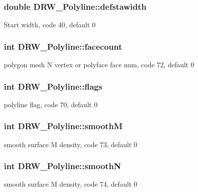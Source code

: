 \subsubsection[{defstawidth}]{\setlength{\rightskip}{0pt plus 5cm}double D\+R\+W\+\_\+\+Polyline\+::defstawidth}\label{class_d_r_w___polyline_a47b35f26221533fdd0d7ef2d91925ca3}
Start width, code 40, default 0 \hypertarget{class_d_r_w___polyline_ae7e68c83478c4dad5550cfc44fa524bd}{}
\subsubsection[{facecount}]{\setlength{\rightskip}{0pt plus 5cm}int D\+R\+W\+\_\+\+Polyline\+::facecount}\label{class_d_r_w___polyline_ae7e68c83478c4dad5550cfc44fa524bd}
polygon mesh N vertex or polyface face num, code 72, default 0 \hypertarget{class_d_r_w___polyline_a328f232ca859ae9f5561e78457833099}{}
\subsubsection[{flags}]{\setlength{\rightskip}{0pt plus 5cm}int D\+R\+W\+\_\+\+Polyline\+::flags}\label{class_d_r_w___polyline_a328f232ca859ae9f5561e78457833099}
polyline flag, code 70, default 0 \hypertarget{class_d_r_w___polyline_aa244ad2243bc7312e01b39876da95edb}{}
\subsubsection[{smooth\+M}]{\setlength{\rightskip}{0pt plus 5cm}int D\+R\+W\+\_\+\+Polyline\+::smooth\+M}\label{class_d_r_w___polyline_aa244ad2243bc7312e01b39876da95edb}
smooth surface M density, code 73, default 0 \hypertarget{class_d_r_w___polyline_a35895911a129d179e1197efa9ca0ec34}{}
\subsubsection[{smooth\+N}]{\setlength{\rightskip}{0pt plus 5cm}int D\+R\+W\+\_\+\+Polyline\+::smooth\+N}\label{class_d_r_w___polyline_a35895911a129d179e1197efa9ca0ec34}
smooth surface M density, code 74, default 0 \hypertarget{class_d_r_w___polyline_ac4bec6f33dd2f8967548d7163525537e}{}
